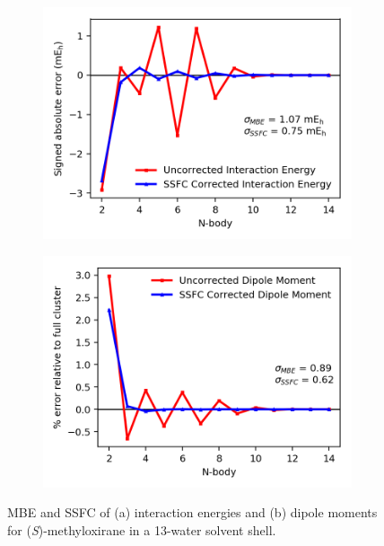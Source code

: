    \begin{figure}
            \begin{subfigure}{.5\textwidth}
                \centering
                \includegraphics[scale=.75]{p1/graphs/metox_13_int.png}
                \caption{}
                \label{int_e_13}
            \end{subfigure}%
            \begin{subfigure}{.5\textwidth}
                \centering
                \includegraphics[scale=.75]{p1/graphs/metox_13_dip.png}
                \caption{}
                \label{dip_13}
            \end{subfigure}
            \caption{MBE and SSFC of (a) interaction energies and (b) dipole moments for (\textit{S})-methyloxirane in a 13-water solvent shell.}
            \label{metox_13}
        \end{figure}
